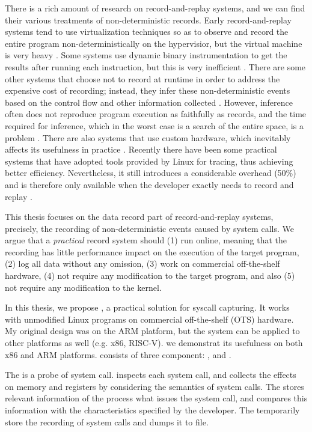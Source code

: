 There is a rich amount of research on record-and-replay systems, and we can find
their various treatments of non-deterministic records. Early record-and-replay
systems tend to use virtualization techniques so as to observe and record the
entire program non-deterministically on the hypervisior, but the virtual machine
is very heavy \cite{dunlap_revirt_2003, dunlap_smp-revirt_2008}. Some systems
use dynamic binary instrumentation to get the results after running each
instruction, but this is very inefficient \cite{bhansali_framework_2006}. There
are some other systems that choose not to record at runtime in order to address
the expensive cost of recording; instead, they infer these non-deterministic
events based on the control flow and other information collected
\cite{altekar_odr_2009,cui_rept_2018}. However, inference often does not
reproduce program execution as faithfully as records, and the time required for
inference, which in the worst case is a search of the entire space, is a problem
\cite{replay_survey}. There are also systems that use custom hardware, which
inevitably affects its usefulness in practice \cite{montesinos_capo_2009}.
Recently there have been some practical systems that have adopted tools provided
by Linux for tracing, thus achieving better efficiency. Nevertheless, it still
introduces a considerable overhead (50\%) and is therefore only available
when the developer exactly needs to record and replay \cite{203227}.

This thesis focuses on the data record part of record-and-replay systems, precisely, the recording of non-deterministic events caused by system calls. We argue that a \textit{practical} record system should  (1) run online, meaning that the recording has little performance impact on the execution of the target program, (2) log all data without any omission, (3) work on commercial off-the-shelf hardware, (4) not require any modification to the target program, and also (5) not require any modification to the kernel.

In this thesis, we propose \TheName, a practical solution for syscall capturing. 
It works with unmodified Linux programs on commercial off-the-shelf (OTS) hardware. My original design was on the ARM platform, but the system can be applied to other platforms as well (e.g. x86, RISC-V). we demonstrat its usefulness on both x86 and ARM platforms. \TheName consists of three component: \CoreHook, \Filter and \RecordBuffer.

The \CoreHook is a probe of system call. \CoreHook inspects each system call,   and collects the effects on memory and registers by considering the semantics of system calls. The \Filter stores relevant information of the process what issues the system call, and compares this information with the characteristics specified by the developer. The \RecordBuffer temporarily store the recording of system calls and dumps it to file.

